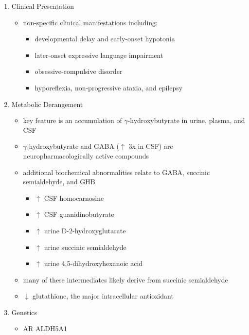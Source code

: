 \documentclass[12pt]{scrartcl}
\begin{document}
\begin{enumerate}
\item Clinical Presentation
\label{sec:orgead7481}
\begin{itemize}
\item non-specific clinical manifestations including:
\begin{itemize}
\item developmental delay and early-onset hypotonia
\item later-onset expressive language impairment
\item obsessive-compulsive disorder
\item hyporeflexia, non-progressive ataxia, and epilepsy
\end{itemize}
\end{itemize}

\item Metabolic Derangement
\label{sec:orgef0ef26}
\begin{itemize}
\item key feature is an accumulation of \(\gamma\)-hydroxybutyrate in urine,
plasma, and CSF
\item \(\gamma\)-hydroxybutyrate and GABA (\(\uparrow\) 3x in CSF) are
neuropharmacologically active compounds
\item additional biochemical abnormalities relate to GABA, succinic semialdehyde, and GHB
\begin{itemize}
\item \(\uparrow\) CSF homocarnosine
\item \(\uparrow\) CSF guanidinobutyrate
\item \(\uparrow\) urine D-2-hydroxyglutarate
\item \(\uparrow\) urine succinic semialdehyde
\item \(\uparrow\) urine 4,5-dihydroxyhexanoic acid
\end{itemize}
\item many of these intermediates likely derive from succinic semialdehyde
\item \(\downarrow\) glutathione, the major intracellular antioxidant
\end{itemize}

\item Genetics
\label{sec:org344019d}
\begin{itemize}
\item AR ALDH5A1
\end{itemize}


\end{enumerate}
\end{document}
